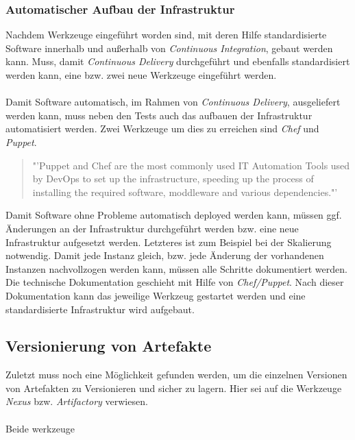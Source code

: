 \subsubsection*{Automatischer Aufbau der Infrastruktur}
Nachdem Werkzeuge eingeführt worden sind, mit deren Hilfe standardisierte Software innerhalb und außerhalb von \textit{Continuous Integration}, gebaut werden kann. Muss, damit \textit{Continuous Delivery} durchgeführt und ebenfalls standardisiert werden kann, eine bzw. zwei neue Werkzeuge eingeführt werden.
\\\\
Damit Software automatisch, im Rahmen von \textit{Continuous Delivery}, ausgeliefert werden kann, muss neben den Tests auch das aufbauen der Infrastruktur automatisiert werden. Zwei Werkzeuge um dies zu erreichen sind \textit{Chef} und \textit{Puppet}.
\begin{quote}
	"'Puppet and Chef are the most commonly used IT Automation Tools used by DevOps to set up the infrastructure, speeding up the process of installing the required software, moddleware and various dependencies."'\cite{IEEE:CDMitJenkins}
\end{quote}
Damit Software ohne Probleme automatisch deployed werden kann, müssen ggf. Änderungen an der Infrastruktur durchgeführt werden bzw. eine neue Infrastruktur aufgesetzt werden. Letzteres ist zum Beispiel bei der Skalierung notwendig. Damit jede Instanz gleich, bzw. jede Änderung der vorhandenen Instanzen nachvollzogen werden kann, müssen alle Schritte dokumentiert werden. Die technische Dokumentation geschieht mit Hilfe von \textit{Chef/Puppet}. Nach dieser Dokumentation kann das jeweilige Werkzeug gestartet werden und eine standardisierte Infrastruktur wird aufgebaut.

\subsection{Versionierung von Artefakte}
Zuletzt muss noch eine Möglichkeit gefunden werden, um die einzelnen Versionen von Artefakten zu Versionieren und sicher zu lagern. Hier sei auf die Werkzeuge \textit{Nexus} bzw. \textit{Artifactory} verwiesen.
\\\\
Beide werkzeuge

